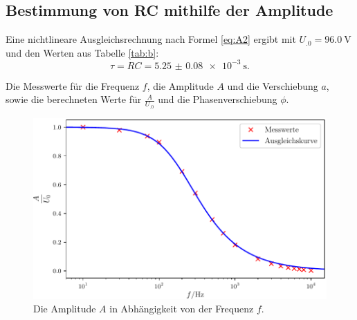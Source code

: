 \subsection{Bestimmung von RC mithilfe der Amplitude}
\label{subsec:2}
Eine nichtlineare Ausgleichsrechnung nach Formel \eqref{eq:A2} ergibt mit $U_.0 = \SI{96.0}{\volt}$ und den Werten aus Tabelle \ref{tab:b}:
\[
\tau = RC = \SI{5.25(8)e-3}{\second}\text{.}
\]

\begin{table}
	\centering
	\caption{Die Messwerte für die Frequenz $f$, die Amplitude $A$ und die Verschiebung $a$, sowie die berechneten Werte für $\frac{A}{U_.0}$ und die Phasenverschiebung $\phi$.}
	
	\label{tab:b}
\end{table}

\begin{figure}
	\centering
	\includegraphics[width=\linewidth-100pt,height=\textheight-100pt,keepaspectratio]{content/images/Graph2.pdf}
	\caption{Die Amplitude $A$ in Abhängigkeit von der Frequenz $f$.}
	\label{fig:Graph2}
\end{figure}


